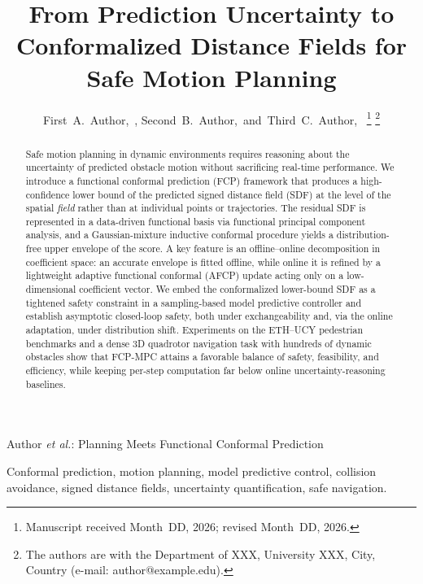 \documentclass[lettersize,journal]{IEEEtran}
\begin{document}
\title{From Prediction Uncertainty to Conformalized Distance Fields for Safe Motion Planning}

\author{First~A.~Author,~,
        Second~B.~Author,~and~Third~C.~Author,~%
\thanks{Manuscript received Month~DD, 2026; revised Month~DD, 2026.}%
\thanks{The authors are with the Department of XXX, University XXX, City, Country
(e-mail: author@example.edu).}}

%
{Author \MakeLowercase{\textit{et al.}}: Planning Meets Functional Conformal Prediction}

\maketitle

\begin{abstract}
Safe motion planning in dynamic environments requires reasoning about the
uncertainty of predicted obstacle motion without sacrificing real-time
performance. We introduce a functional conformal prediction (FCP) framework that
produces a high-confidence lower bound of the predicted signed distance field
(SDF) at the level of the spatial \emph{field} rather than at individual points or
trajectories. The residual SDF is represented in a data-driven functional basis
via functional principal component analysis, and a Gaussian-mixture inductive
conformal procedure yields a distribution-free upper envelope of the score. A key feature is an offline--online decomposition in coefficient space: an
accurate envelope is fitted offline, while online it is refined by a lightweight
adaptive functional conformal (AFCP) update acting only on a low-dimensional
coefficient vector. We embed the conformalized lower-bound SDF as a tightened
safety constraint in a sampling-based model predictive controller and establish
asymptotic closed-loop safety, both under exchangeability and, via the online
adaptation, under distribution shift. Experiments on the ETH--UCY pedestrian
benchmarks and a dense 3D quadrotor navigation task with hundreds of dynamic
obstacles show that FCP-MPC attains a favorable balance of safety, feasibility,
and efficiency, while keeping per-step computation far below online
uncertainty-reasoning baselines.
\end{abstract}

\begin{IEEEkeywords}
Conformal prediction, motion planning, model predictive control, collision
avoidance, signed distance fields, uncertainty quantification, safe navigation.
\end{IEEEkeywords}
\end{document}
